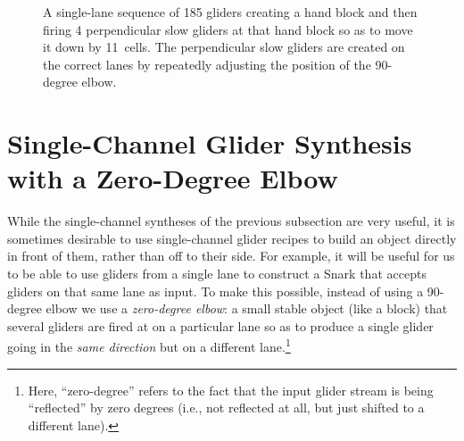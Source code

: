 \begin{figure}[!htb]
	
	\caption{A single-lane sequence of 185 gliders creating a hand block and then firing 4 perpendicular slow gliders at that hand block so as to move it down by 11~cells. The perpendicular slow gliders are created on the correct lanes by repeatedly adjusting the position of the 90-degree elbow.}\label{fig:90_degree_block_move}
\end{figure}



\section{Single-Channel Glider Synthesis with a Zero-Degree Elbow}\label{sec:single_channel_synth_0}

While the single-channel syntheses of the previous subsection are very useful, it is sometimes desirable to use single-channel glider recipes to build an object directly in front of them, rather than off to their side. For example, it will be useful for us to be able to use gliders from a single lane to construct a Snark that accepts gliders on that same lane as input. To make this possible, instead of using a 90-degree elbow we use a \emph{zero-degree elbow}: a small stable object (like a block) that several gliders are fired at on a particular lane so as to produce a single glider going in the \emph{same direction} but on a different lane.\footnote{Here, ``zero-degree'' refers to the fact that the input glider stream is being ``reflected'' by zero degrees (i.e., not reflected at all, but just shifted to a different lane).}


